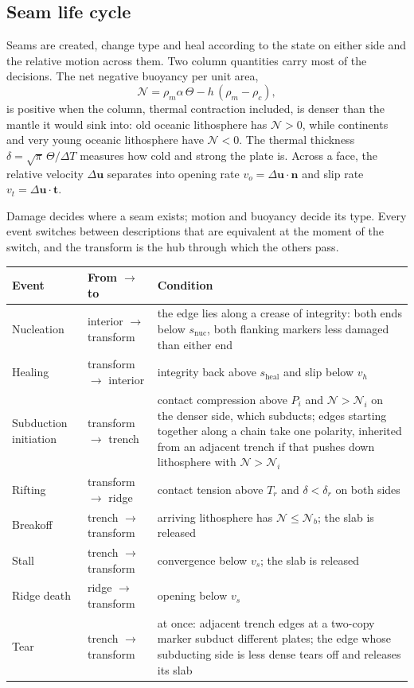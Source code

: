 \documentclass[11pt]{article}
\newcommand{\vect}[1]{\mathbf{#1}}
\begin{document}
\subsection{Seam life cycle}
\label{sec:lifecycle}
Seams are created, change type and heal according to the state on either side and the relative motion across them. Two column quantities carry most of the decisions. The net negative buoyancy per unit area,
\begin{equation}
  \mathcal{N} = \rho_m\alpha\,\Theta - h\,(\rho_m-\rho_c),
  \label{eq:buoy}
\end{equation}
is positive when the column, thermal contraction included, is denser than the mantle it would sink into: old oceanic lithosphere has $\mathcal{N}>0$, while continents and very young oceanic lithosphere have $\mathcal{N}<0$. The thermal thickness $\delta=\sqrt\pi\,\Theta/\Delta T$ measures how cold and strong the plate is. Across a face, the relative velocity $\Delta\vect u$ separates into opening rate $v_o=\Delta\vect u\cdot\vect n$ and slip rate $v_t=\Delta\vect u\cdot\vect t$.

Damage decides where a seam exists; motion and buoyancy decide its type. Every event switches between descriptions that are equivalent at the moment of the switch, and the transform is the hub through which the others pass.

\begin{center}
\small
\begin{tabular}{@{}lll@{}}
\toprule
Event & From $\to$ to & Condition\\
\midrule
Nucleation & interior $\to$ transform & the edge lies along a crease of integrity: both ends below $s_{\mathrm{nuc}}$, both flanking markers less damaged than either end\\
Healing & transform $\to$ interior & integrity back above $s_{\mathrm{heal}}$ and slip below $v_h$\\
Subduction initiation & transform $\to$ trench & contact compression above $P_i$ and $\mathcal N>\mathcal N_i$ on the denser side, which subducts; edges starting together along a chain take one polarity, inherited from an adjacent trench if that pushes down lithosphere with $\mathcal N>\mathcal N_i$\\
Rifting & transform $\to$ ridge & contact tension above $T_r$ and $\delta<\delta_r$ on both sides\\
Breakoff & trench $\to$ transform & arriving lithosphere has $\mathcal N\le\mathcal N_b$; the slab is released\\
Stall & trench $\to$ transform & convergence below $v_s$; the slab is released\\
Ridge death & ridge $\to$ transform & opening below $v_s$\\
Tear & trench $\to$ transform & at once: adjacent trench edges at a two-copy marker subduct different plates; the edge whose subducting side is less dense tears off and releases its slab\\
\bottomrule
\end{tabular}
\end{center}
\end{document}
